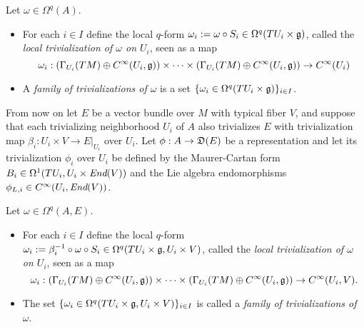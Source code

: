 \begin{definition}\label{definitionLocalTrivializationOfScalarValuedForms}
Let $\omega \in \Omega^q(A)$.
    \begin{itemize}
    
    \item For each $i \in I$ define the local $q$-form $\omega_i := \omega \circ S_i \in \Omega^q(TU_i\times \mathfrak{g})$, called the \emph{local trivialization of $\omega$ on $U_i$}, seen as a map
   $$
        \omega_i :\left( \Gamma_{U_i}(TM)\oplus C^\infty({U_i}, \mathfrak{g}) \right) \times \cdots \times \left( \Gamma_{U_i}(TM)\oplus C^\infty({U_i}, \mathfrak{g}) \right) \to C^\infty({U_i})
    $$
    
    \item A \emph{family of trivializations of $\omega$} is a set $\{\omega_i \in \Omega^q(TU_i \times \mathfrak{g})\}_{i \in I}$.
    
    \end{itemize}

\end{definition}

From now on let $E$ be a vector bundle over $M$ with typical fiber $V$, and suppose that each trivializing neighborhood $U_i$ of $A$ also trivializes $E$ with trivialization map $\beta_i: U_i \times V \to E|_{U_i}$ over $U_i$. Let $\phi:A \to \alg D(E)$ be a representation and let its trivialization $\phi_i$ over $U_i$ be defined by the Maurer-Cartan form $B_i \in \Omega^1(TU_i, U_i \times \operatorname{\textit{End}}(V))$ and the Lie algebra endomorphisms $\phi_{L,i} \in C^\infty(U_i, \End(V))$.

\begin{definition}\label{definitionLocalTrivializationOfEValuedForms}
Let $\omega \in \Omega^q(A, E)$.
    \begin{itemize}
    
    \item For each $i \in I$ define the local $q$-form $\omega_i:= \beta_i^{-1} \circ \omega \circ S_i  \in \Omega^q(TU_i\times \mathfrak{g}, {U_i} \times V)$, called the \emph{local trivialization of $\omega$ on $U_i$}, seen as a map
    $$
        \omega_i :\left( \Gamma_{U_i}(TM)\oplus C^\infty({U_i}, \mathfrak{g}) \right) \times \cdots \times \left( \Gamma_{U_i}(TM)\oplus C^\infty({U_i}, \mathfrak{g}) \right) \to C^\infty({U_i}, V).
    $$
    
    \item The set $\{\omega_i \in \Omega^q(TU_i\times \mathfrak{g}, U_i \times V)\}_{i \in I}$ is called a \emph{family of trivializations of $\omega$}.
    
    \end{itemize}

\end{definition}

